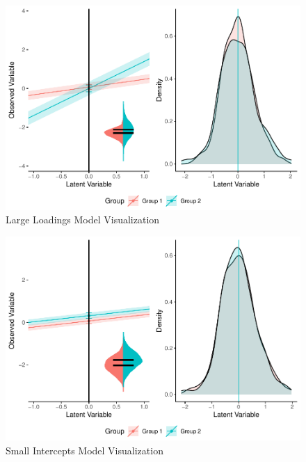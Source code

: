 \documentclass[
  man]{apa6}
\begin{document}
\begin{figure}
\centering
\includegraphics{manuscript_files/figure-latex/large-load-pic-1.pdf}
\caption{\label{fig:large-load-pic}Large Loadings Model Visualization}
\end{figure}

\begin{figure}
\centering
\includegraphics{manuscript_files/figure-latex/small-int-pic-1.pdf}
\caption{\label{fig:small-int-pic}Small Intercepts Model Visualization}
\end{figure}
\end{document}
